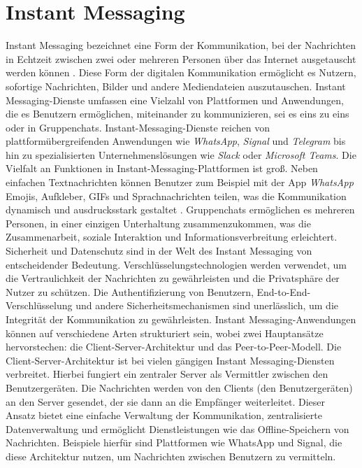 \section{Instant Messaging}


Instant Messaging bezeichnet eine Form der Kommunikation, bei der Nachrichten in Echtzeit zwischen zwei oder mehreren Personen über das Internet ausgetauscht werden können \Parencite[S. 69]{nist_mobileDeviceForensics}. Diese Form der digitalen Kommunikation ermöglicht es Nutzern, sofortige Nachrichten, Bilder und andere Mediendateien auszutauschen. Instant Messaging-Dienste umfassen eine Vielzahl von Plattformen und Anwendungen, die es Benutzern ermöglichen, miteinander zu kommunizieren, sei es eins zu eins oder in Gruppenchats. Instant-Messaging-Dienste reichen von plattformübergreifenden Anwendungen wie \textit{WhatsApp}, \textit{Signal} und \textit{Telegram} bis hin zu spezialisierten Unternehmenslösungen wie \textit{Slack} oder \textit{Microsoft Teams}. Die Vielfalt an Funktionen in Instant-Messaging-Plattformen ist groß. Neben einfachen Textnachrichten können Benutzer zum Beispiel mit der App \textit{WhatsApp} Emojis, Aufkleber, GIFs und Sprachnachrichten teilen, was die Kommunikation dynamisch und ausdrucksstark gestaltet \Parencite{whatsapp_funktionen}. Gruppenchats ermöglichen es mehreren Personen, in einer einzigen Unterhaltung zusammenzukommen, was die Zusammenarbeit, soziale Interaktion und Informationsverbreitung erleichtert.
Sicherheit und Datenschutz sind in der Welt des Instant Messaging von entscheidender Bedeutung. Verschlüsselungstechnologien werden verwendet, um die Vertraulichkeit der Nachrichten zu gewährleisten und die Privatsphäre der Nutzer zu schützen. Die Authentifizierung von Benutzern, End-to-End-Verschlüsselung und andere Sicherheitsmechanismen sind unerlässlich, um die Integrität der Kommunikation zu gewährleisten.
Instant Messaging-Anwendungen können auf verschiedene Arten strukturiert sein, wobei zwei Hauptansätze hervorstechen: die Client-Server-Architektur und das Peer-to-Peer-Modell.
Die Client-Server-Architektur ist bei vielen gängigen Instant Messaging-Diensten verbreitet. Hierbei fungiert ein zentraler Server als Vermittler zwischen den Benutzergeräten. Die Nachrichten werden von den Clients (den Benutzergeräten) an den Server gesendet, der sie dann an die Empfänger weiterleitet. Dieser Ansatz bietet eine einfache Verwaltung der Kommunikation, zentralisierte Datenverwaltung und ermöglicht Dienstleistungen wie das Offline-Speichern von Nachrichten. Beispiele hierfür sind Plattformen wie WhatsApp und Signal, die diese Architektur nutzen, um Nachrichten zwischen Benutzern zu vermitteln.
